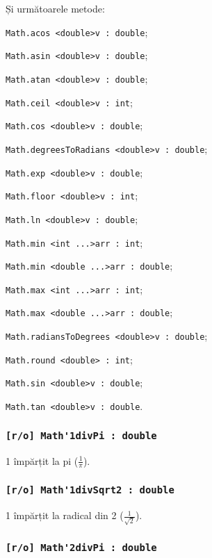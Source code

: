 Și următoarele metode:
\begin{icItems}
	\item \lstinline|Math.acos <double>v : double|;
	\item \lstinline|Math.asin <double>v : double|;
	\item \lstinline|Math.atan <double>v : double|;
	\item \lstinline|Math.ceil <double>v : int|;
	\item \lstinline|Math.cos <double>v : double|;
	\item \lstinline|Math.degreesToRadians <double>v : double|;
	\item \lstinline|Math.exp <double>v : double|;
	\item \lstinline|Math.floor <double>v : int|;
	\item \lstinline|Math.ln <double>v : double|;
	\item \lstinline|Math.min <int ...>arr : int|;
	\item \lstinline|Math.min <double ...>arr : double|;
	\item \lstinline|Math.max <int ...>arr : int|;
	\item \lstinline|Math.max <double ...>arr : double|;
	\item \lstinline|Math.radiansToDegrees <double>v : double|;
	\item \lstinline|Math.round <double> : int|;
	\item \lstinline|Math.sin <double>v : double|;
	\item \lstinline|Math.tan <double>v : double|.
\end{icItems}

\subsubsection{\lstinline|[r/o] Math'1divPi : double|}

1 împărțit la pi ($\frac{1}{\pi}$).

\subsubsection{\lstinline|[r/o] Math'1divSqrt2 : double|}

1 împărțit la radical din 2 ($\frac{1}{\sqrt{2}}$).

\subsubsection{\lstinline|[r/o] Math'2divPi : double|}

